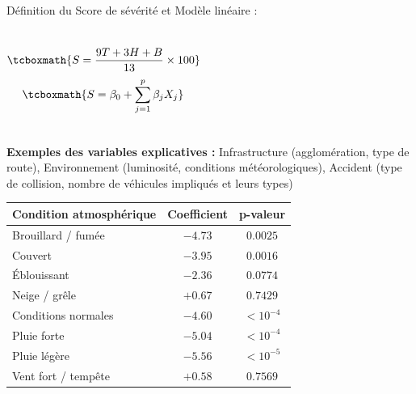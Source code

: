\documentclass[11pt]{beamer}
\begin{document}
\begin{frame}{Définition du Score de sévérité et Modèle linéaire :}
\begin{columns}

\vspace{-0.5cm}
\[
\tcboxmath{
S = \frac{9T + 3H + B}{13} \times 100
}
\]
\vspace{-0.1cm}
\[
\tcboxmath{
S = \beta_0 + \sum_{j=1}^{p} \beta_j X_j
}
\]

\end{columns}
\textbf{Exemples des variables explicatives : } Infrastructure (agglomération, type de route), Environnement (luminosité, conditions météorologiques), Accident (type de collision, nombre de véhicules impliqués et leurs types)

\vspace{+0.2cm}
\small
\centering
\begin{tabular}{l c c}
\hline
\textbf{Condition atmosphérique} & \textbf{Coefficient} & \textbf{p-valeur} \\
\hline
Brouillard / fumée        & $-4.73$ & $0.0025$ \\
Couvert                  & $-3.95$ & $0.0016$ \\
Éblouissant               & $-2.36$ & $0.0774$ \\
Neige / grêle             & $+0.67$ & $0.7429$ \\
Conditions normales       & $-4.60$ & $< 10^{-4}$ \\
Pluie forte               & $-5.04$ & $< 10^{-4}$ \\
Pluie légère              & $-5.56$ & $< 10^{-5}$ \\
Vent fort / tempête       & $+0.58$ & $0.7569$ \\
\hline
\end{tabular}
\end{frame}
\end{document}
